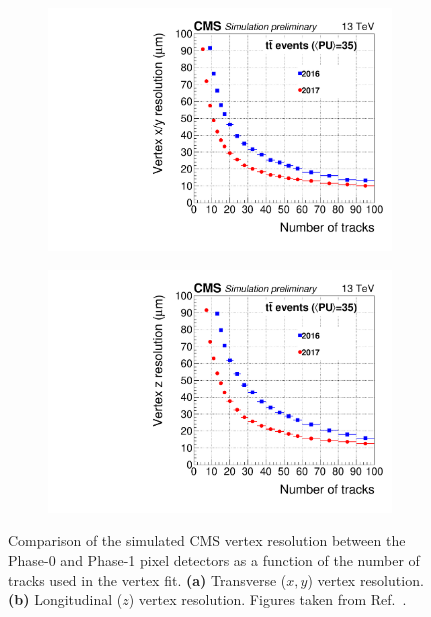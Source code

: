 \begin{figure}[h]
    \centering
    \begin{subfigure}[b]{0.49\textwidth}
        \centering
        \includegraphics[width=\textwidth]{Figures/Chapter3/Pixel_Vertex_XY_Resolution.pdf}
        \caption{}
    \end{subfigure}
    \begin{subfigure}[b]{0.49\textwidth}
        \centering
        \includegraphics[width=\textwidth]{Figures/Chapter3/Pixel_Vertex_Z_Resolution.pdf}
        \caption{}
    \end{subfigure}
\caption[Vertex resolution comparison between Phase-0 and Phase-1 pixel detectors]{Comparison of the simulated CMS vertex resolution between the Phase-0 and Phase-1 pixel detectors as a function of the number of tracks used in the vertex fit. \textbf{(a)} Transverse ($x,y$) vertex resolution. \textbf{(b)} Longitudinal ($z$) vertex resolution. Figures taken from Ref.~\cite{Pixel_Vertex_Performance}.}

\label{Figure:Chapter3_Pixel_Vertex_Resolution}
\end{figure}


